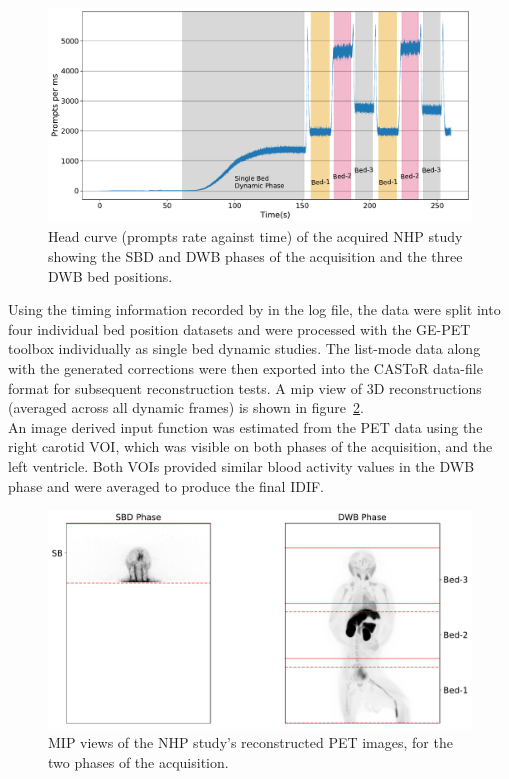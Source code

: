 \begin{figure} [ht!]
\centering
\includegraphics[scale=0.45,angle=0]{3_Results/3_1_DWB_Optimization/figures/3_1_Macaque_Head_curve_Phases.pdf}
\caption{Head curve (prompts rate against time) of the acquired NHP study showing the SBD and DWB phases of the acquisition and the three DWB bed positions.}
\label{fig3_1:Macaque_Head_Curve_Phases}
\end{figure}
%
Using the timing information recorded by in the log file, the data were split into four individual bed position datasets and were processed with the GE-PET toolbox individually as single bed dynamic studies. The list-mode data along with the generated corrections were then exported into the CASToR data-file format for subsequent reconstruction tests. A \gls{mip} view of 3D reconstructions (averaged across all dynamic frames) is shown in figure~\ref{fig3_1:Macaque_PET}. \\
An image derived input function was estimated from the PET data using the right carotid VOI, which was visible on both phases of the acquisition, and the left ventricle. Both VOIs provided similar blood activity values in the DWB phase and were averaged to produce the final IDIF.
%
\begin{figure} [ht!]
\centering
\includegraphics[scale=0.45,angle=0]{3_Results/3_1_DWB_Optimization/figures/3_1_Macaque_PET.pdf}
\caption{MIP views of the NHP study's reconstructed PET images, for the two phases of the acquisition.}
\label{fig3_1:Macaque_PET}
\end{figure}
